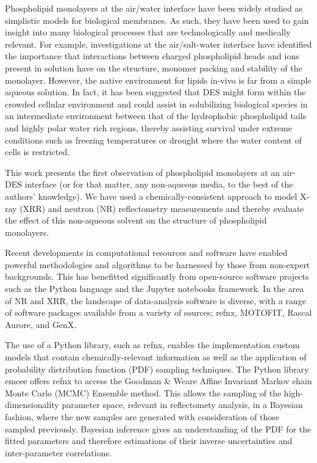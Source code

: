 \documentclass[%
 reprint,
 amsmath,amssymb,
 prl,
]{revtex4-1}
\begin{document}
Phospholipid monolayers at the air/water interface have been widely studied as simplistic models for biological membranes.
As such, they have been used to gain insight into many biological processes that are technologically and medically relevant.
For example, investigations at the air/salt-water interface have identified the importance that interactions between charged phospholipid heads and ions present in solution have on the structure, monomer packing and stability of the monolayer\cite{Mohwald1990,Kewalramani2010}.
However, the native environment for lipids in-vivo is far from a simple aqueous solution.
In fact, it has been suggested\cite{Dai2013,Hammond2017} that DES might form within the crowded cellular environment and could assist in solubilizing biological species in an intermediate environment between that of the hydrophobic phospholipid tails and highly polar water rich regions, thereby assisting survival under extreme conditions such as freezing temperatures or drought where the water content of cells is restricted.

This work presents the first observation of phospholipid monolayers at an air-DES interface (or for that matter, any non-aqueous media, to the best of the authors' knowledge).
We have used a chemically-consistent approach to model X-ray (XRR) and neutron (NR) reflectometry measurements and thereby evaluate the effect of this non-aqueous solvent on the structure of phospholipid monolayers.

Recent developments in computational resources and software have enabled powerful methodologies and algorithms to be harnessed by those from non-expert backgrounds.
This has benefitted significantly from open-source software projects such as the Python language\cite{vanRossum1995} and the Jupyter notebooks framework\cite{Kluyver2016}.
In the area of NR and XRR, the landscape of data-analysis software is diverse, with a range of software packages available from a variety of sources; refnx\cite{Nelson2018}, MOTOFIT\cite{Nelson2006}, Rascal\cite{HughesRascal} Aurore\cite{Gerelli2016}, and GenX\cite{Bjorck2007}.

The use of a Python library, such as refnx, enables the implementation custom models that contain chemically-relevant information as well as the application of probability distribution function (PDF) sampling techniques.
The Python library emcee\cite{Foreman-Mackey2013} offers refnx to access the Goodman \& Weare Affine Invariant Markov chain Monte Carlo (MCMC) Ensemble method\cite{Goodman2010}.
This allows the sampling of the high-dimensionality parameter space, relevant in reflectomety analysis, in a Bayesian fashion, where the new samples are generated with consideration of those sampled previously\cite{Sivia2006}.
Bayesian inference gives an understanding of the PDF for the fitted parameters and therefore estimations of their inverse uncertainties and inter-parameter correlations.
\end{document}
